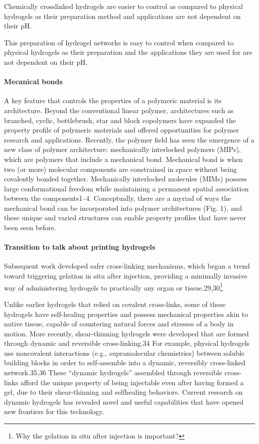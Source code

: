 Chemically crosslinked hydrogels are easier to control as compared to physical hydrogels as their preparation method and applications are not dependent on their pH.

This preparation of hydrogel networks is easy to control when compared to physical hydrogels as their preparation and the applications they are used for are not dependent on their pH. 

\paragraph{Mecanical bonds}\citep{hartMaterialPropertiesApplications2021}
A key feature that controls the properties of a polymeric material is its architecture. 
Beyond the conventional linear polymer, architectures such as branched, cyclic, bottlebrush, star and block copolymers have expanded the property profile of polymeric materials and offered opportunities for polymer research and applications. 
Recently, the polymer field has seen the emergence of a new class of polymer architecture: mechanically interlocked polymers (MIPs), which are polymers that include a mechanical bond.
Mechanical bond is when two (or more) molecular components are constrained in space without being covalently bonded together.
Mechanically interlocked molecules (MIMs) possess large conformational freedom while maintaining a permanent spatial association between the components1–4. 
Conceptually, there are a myriad of ways the mechanical bond can be incorporated into polymer architectures (Fig. 1), and these unique and varied structures can enable property profiles that have never been seen before.


\paragraph{Transition to talk about printing hydrogels}\citep{correaTranslationalApplicationsHydrogels2021}
Subsequent work developed safer cross-linking mechanisms, which began a trend toward triggering gelation in situ after injection, providing a minimally invasive way of administering  hydrogels to practically any organ or tissue.29,30\footnote{Why the gelation in situ after injection is important?}

Unlike earlier hydrogels that relied on covalent cross-links, some of these hydrogels have self-healing properties and possess mechanical properties akin to native tissue, capable of countering natural forces and stresses of a body in motion.
More recently, shear-thinning hydrogels were developed that are formed through dynamic and reversible cross-linking.34 
For example, physical hydrogels use noncovalent interactions (e.g., supramolecular chemistries) between soluble building blocks in order to self-assemble into a dynamic, reversibly cross-linked  network.35,36 
These “dynamic hydrogels” assembled through reversible cross-links afford the unique property of being injectable even after having formed a gel, due to their shear-thinning and selfhealing behaviors. 
Current research on dynamic hydrogels has revealed novel and useful capabilities that have opened new frontiers for this technology. 

